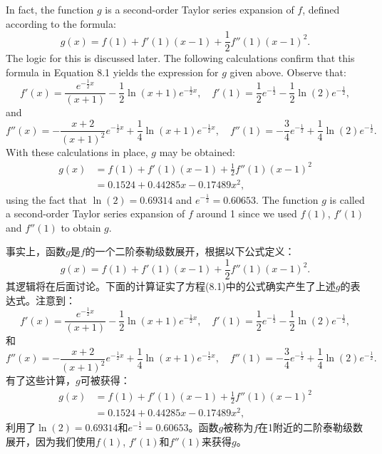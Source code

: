 \begin{original}
In fact, the function $g$ is a second-order Taylor series expansion of $f$, defined according to the formula:
\[
g(x) = f(1) + f'(1)(x - 1) + \frac{1}{2} f''(1)(x - 1)^2. \tag{8.1}
\]
The logic for this is discussed later. The following calculations confirm that this formula in Equation 8.1 yields the expression for $g$ given above. Observe that:
\[
f'(x) = \frac{e^{-\frac{1}{2}x}}{(x+1)} - \frac{1}{2}\ln(x+1)e^{-\frac{1}{2}x}, \quad
f'(1) = \frac{1}{2}e^{-\frac{1}{2}} - \frac{1}{2}\ln(2)e^{-\frac{1}{2}},
\]
and
\[
f''(x) = -\frac{x+2}{(x+1)^2}e^{-\frac{1}{2}x} + \frac{1}{4}\ln(x+1)e^{-\frac{1}{2}x}, \quad
f''(1) = -\frac{3}{4}e^{-\frac{1}{2}} + \frac{1}{4}\ln(2)e^{-\frac{1}{2}}.
\]
With these calculations in place, $g$ may be obtained:
\begin{align*}
g(x) &= f(1) + f'(1)(x-1) + \frac{1}{2}f''(1)(x-1)^2 \\
&= 0.1524 + 0.44285x - 0.17489x^2,
\end{align*}
using the fact that $\ln(2) = 0.69314$ and $e^{-\frac{1}{2}} = 0.60653$. The function $g$ is called a second-order Taylor series expansion of $f$ around 1 since we used $f(1)$, $f'(1)$ and $f''(1)$ to obtain $g$.
\end{original}
\begin{translation}
事实上，函数$g$是$f$的一个二阶泰勒级数展开，根据以下公式定义：
\[
g(x) = f(1) + f'(1)(x - 1) + \frac{1}{2} f''(1)(x - 1)^2. \tag{8.1}
\]
其逻辑将在后面讨论。下面的计算证实了方程(8.1)中的公式确实产生了上述$g$的表达式。注意到：
\[
f'(x) = \frac{e^{-\frac{1}{2}x}}{(x+1)} - \frac{1}{2}\ln(x+1)e^{-\frac{1}{2}x}, \quad
f'(1) = \frac{1}{2}e^{-\frac{1}{2}} - \frac{1}{2}\ln(2)e^{-\frac{1}{2}},
\]
和
\[
f''(x) = -\frac{x+2}{(x+1)^2}e^{-\frac{1}{2}x} + \frac{1}{4}\ln(x+1)e^{-\frac{1}{2}x}, \quad
f''(1) = -\frac{3}{4}e^{-\frac{1}{2}} + \frac{1}{4}\ln(2)e^{-\frac{1}{2}}.
\]
有了这些计算，$g$可被获得：
\begin{align*}
g(x) &= f(1) + f'(1)(x-1) + \frac{1}{2}f''(1)(x-1)^2 \\
&= 0.1524 + 0.44285x - 0.17489x^2,
\end{align*}
利用了$\ln(2) = 0.69314$和$e^{-\frac{1}{2}} = 0.60653$。函数$g$被称为$f$在1附近的二阶泰勒级数展开，因为我们使用$f(1)$, $f'(1)$和$f''(1)$来获得$g$。
\end{translation}


